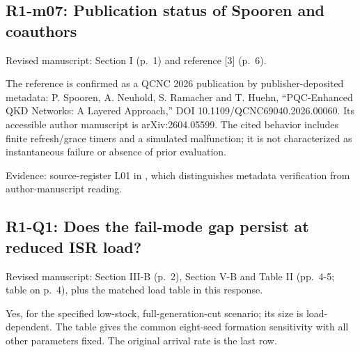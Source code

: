 \documentclass[a4paper,11pt]{article}
\begin{document}
\subsection{R1-m07: Publication status of Spooren and coauthors}\label{r1-m07-publication-status-of-spooren-and-coauthors}

Revised manuscript: Section I (p.~1) and reference {[}3{]} (p.~6).

The reference is confirmed as a QCNC 2026 publication by publisher-deposited metadata: P. Spooren, A. Neuhold, S. Ramacher and T. Huehn, ``PQC-Enhanced QKD Networks: A Layered Approach,'' DOI 10.1109/QCNC69040.2026.00060. Its accessible author manuscript is arXiv:2604.05599. The cited behavior includes finite refresh/grace timers and a simulated malfunction; it is not characterized as instantaneous failure or absence of prior evaluation.

Evidence: source-register L01 in , which distinguishes metadata verification from author-manuscript reading.

\subsection{R1-Q1: Does the fail-mode gap persist at reduced ISR load?}\label{r1-q1-does-the-fail-mode-gap-persist-at-reduced-isr-load}

Revised manuscript: Section III-B (p.~2), Section V-B and Table II (pp.~4-5; table on p.~4), plus the matched load table in this response.

Yes, for the specified low-stock, full-generation-cut scenario; its size is load-dependent. The table gives the common eight-seed formation sensitivity with all other parameters fixed. The original arrival rate is the last row.
\end{document}
